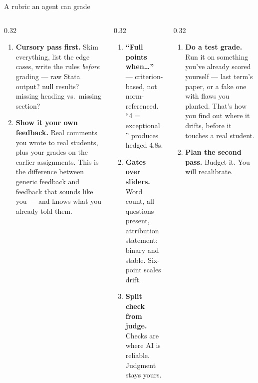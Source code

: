 \documentclass[aspectratio=169, 10pt]{beamer}
\begin{document}
\begin{frame}{A rubric an agent can grade}
\vskip-2pt
\begin{columns}[T]
\begin{column}{0.32\textwidth}
\begin{tcolorbox}[pipelinebox, title={\faBook\quad Before you write it}, top=2pt, bottom=2pt]
\scriptsize
\begin{enumerate}\setlength{\itemsep}{4pt}
  \item \textbf{Cursory pass first.} Skim everything, list the edge cases, write the rules \emph{before} grading --- raw Stata output? null results? missing heading vs.\ missing section?
  \item \textbf{Show it your own feedback.} Real comments you wrote to real students, plus your grades on the earlier assignments. This is the difference between generic feedback and feedback that sounds like you --- and knows what you already told them.
\end{enumerate}
\end{tcolorbox}
\end{column}
\begin{column}{0.32\textwidth}
\begin{tcolorbox}[keybox, title={\faListOl\quad In the rubric itself}, top=2pt, bottom=2pt]
\scriptsize
\begin{enumerate}\setlength{\itemsep}{4pt}\setcounter{enumi}{2}
  \item \textbf{``Full points when\ldots''} --- criterion-based, not norm-referenced. ``4 = exceptional'' produces hedged 4.8s.
  \item \textbf{Gates over sliders.} Word count, all questions present, attribution statement: binary and stable. Six-point scales drift.
  \item \textbf{Split check from judge.} Checks are where AI is reliable. Judgment stays yours.
\end{enumerate}
\end{tcolorbox}
\end{column}
\begin{column}{0.32\textwidth}
\begin{tcolorbox}[dobox, title={\faFlask\quad Before you trust it}, top=2pt, bottom=2pt]
\scriptsize
\begin{enumerate}\setlength{\itemsep}{4pt}\setcounter{enumi}{5}
  \item \textbf{Do a test grade.} Run it on something you've already scored yourself --- last term's paper, or a fake one with flaws you planted. That's how you find out where it drifts, before it touches a real student.
  \item \textbf{Plan the second pass.} Budget it. You will recalibrate.
\end{enumerate}
\end{tcolorbox}
\end{column}
\end{columns}
\end{frame}
\end{document}
